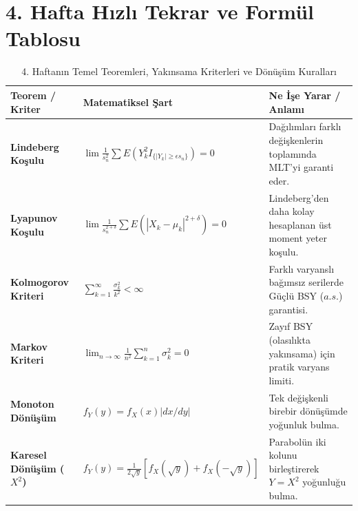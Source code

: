 \documentclass[12pt,a4paper]{article}
\begin{document}
\begin{center}
\end{center}

\vspace{0.5em}
\section{4. Hafta Hızlı Tekrar ve Formül Tablosu}

\begin{table}[ht]
\centering
\small
\renewcommand{\arraystretch}{1.35}
\begin{tabularx}{\textwidth}{@{}l l X@{}}
\toprule
\textbf{Teorem / Kriter} & \textbf{Matematiksel Şart} & \textbf{Ne İşe Yarar / Anlamı} \\ \midrule
\textbf{Lindeberg Koşulu} & $\lim \frac{1}{s_n^2} \sum E(Y_k^2 I_{\{|Y_k| \ge \epsilon s_n\}}) = 0$ & Dağılımları farklı değişkenlerin toplamında MLT'yi garanti eder. \\
\textbf{Lyapunov Koşulu} & $\lim \frac{1}{s_n^{2+\delta}} \sum E(|X_k-\mu_k|^{2+\delta}) = 0$ & Lindeberg'den daha kolay hesaplanan üst moment yeter koşulu. \\
\textbf{Kolmogorov Kriteri} & $\sum_{k=1}^\infty \frac{\sigma_k^2}{k^2} < \infty$ & Farklı varyanslı bağımsız serilerde Güçlü BSY ($a.s.$) garantisi. \\
\textbf{Markov Kriteri} & $\lim_{n \to \infty} \frac{1}{n^2} \sum_{k=1}^n \sigma_k^2 = 0$ & Zayıf BSY (olasılıkta yakınsama) için pratik varyans limiti. \\
\textbf{Monoton Dönüşüm} & $f_Y(y) = f_X(x) |dx/dy|$ & Tek değişkenli birebir dönüşümde yoğunluk bulma. \\
\textbf{Karesel Dönüşüm ($X^2$)} & $f_Y(y) = \frac{1}{2\sqrt{y}}[f_X(\sqrt{y}) + f_X(-\sqrt{y})]$ & Parabolün iki kolunu birleştirerek $Y=X^2$ yoğunluğu bulma. \\ \bottomrule
\end{tabularx}
\caption{4. Haftanın Temel Teoremleri, Yakınsama Kriterleri ve Dönüşüm Kuralları}
\end{table}
\end{document}
